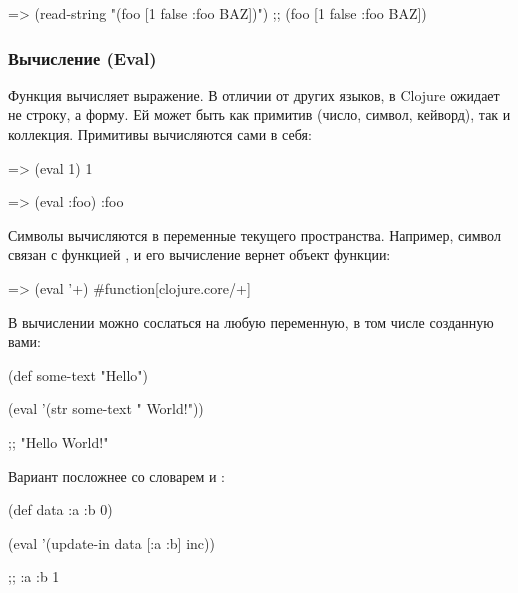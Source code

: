 \begin{english}
  \begin{clojure}
=> (read-string "(foo [1 false {:foo BAZ}])")
;; (foo [1 false {:foo BAZ}])
  \end{clojure}
\end{english}

\subsubsection{Вычисление (Eval)}

Функция  вычисляет выражение. В отличии от других языков, в Clojure  ожидает не строку, а форму. Ей может быть как примитив (число, символ, кейворд), так и коллекция. Примитивы вычисляются сами в себя:

\begin{english}
  \begin{clojure}
=> (eval 1)
1

=> (eval :foo)
:foo
  \end{clojure}
\end{english}
Символы вычисляются в переменные текущего пространства. Например, символ \code{+}
связан с функцией , и его вычисление вернет объект функции:

\begin{english}
  \begin{clojure}
=> (eval '+)
#function[clojure.core/+]
  \end{clojure}
\end{english}

В вычислении можно сослаться на любую переменную, в том числе созданную вами:

\begin{english}
  \begin{clojure}
(def some-text "Hello")

(eval '(str some-text " World!"))

;; "Hello World!"
  \end{clojure}
\end{english}

Вариант посложнее со словарем и :

\begin{english}
  \begin{clojure}
(def data {:a {:b 0}})

(eval '(update-in data [:a :b] inc))

;; {:a {:b 1}}
  \end{clojure}
\end{english}

